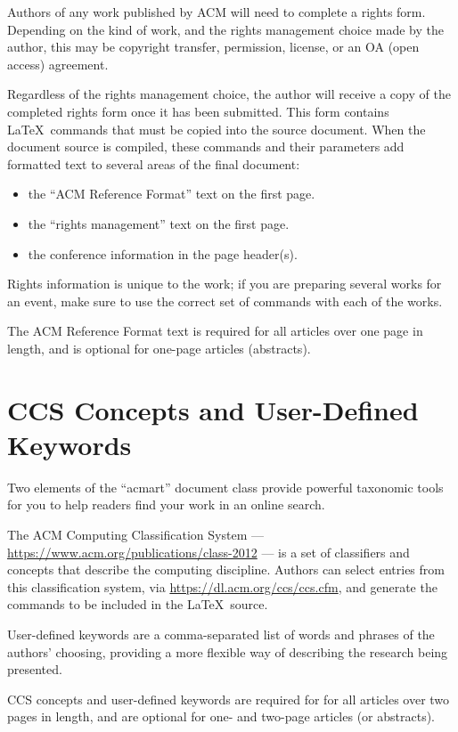 Authors of any work published by ACM will need to complete a rights
form. Depending on the kind of work, and the rights management choice
made by the author, this may be copyright transfer, permission,
license, or an OA (open access) agreement.

Regardless of the rights management choice, the author will receive a
copy of the completed rights form once it has been submitted. This
form contains \LaTeX\ commands that must be copied into the source
document. When the document source is compiled, these commands and
their parameters add formatted text to several areas of the final
document:
\begin{itemize}
	\item the ``ACM Reference Format'' text on the first page.
	\item the ``rights management'' text on the first page.
	\item the conference information in the page header(s).
\end{itemize}

Rights information is unique to the work; if you are preparing several
works for an event, make sure to use the correct set of commands with
each of the works.

The ACM Reference Format text is required for all articles over one
page in length, and is optional for one-page articles (abstracts).

\section{CCS Concepts and User-Defined Keywords}

Two elements of the ``acmart'' document class provide powerful
taxonomic tools for you to help readers find your work in an online
search.

The ACM Computing Classification System ---
\url{https://www.acm.org/publications/class-2012} --- is a set of
classifiers and concepts that describe the computing
discipline. Authors can select entries from this classification
system, via \url{https://dl.acm.org/ccs/ccs.cfm}, and generate the
commands to be included in the \LaTeX\ source.

User-defined keywords are a comma-separated list of words and phrases
of the authors' choosing, providing a more flexible way of describing
the research being presented.

CCS concepts and user-defined keywords are required for for all
articles over two pages in length, and are optional for one- and
two-page articles (or abstracts).


